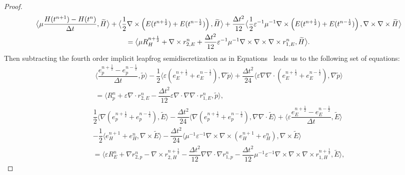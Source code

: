 \documentclass{amsart}
\theoremstyle{thmstyleone}%
\theoremstyle{thmstyletwo}%
\theoremstyle{thmstylethree}%
\newcommand{\aInnerproduct}[2]{\bigl\langle #1, #2 \bigr\rangle}
\begin{document}
\begin{proof}
\begin{subequations}
\begin{multline}
     \end{multline} \\
      \begin{multline}
  \aInnerproduct{\mu \dfrac{H(t^{n + 1}) - H(t^n)}{\Delta t}}{\widetilde{H}} +  \aInnerproduct{\dfrac{1}{2} \nabla \times \left( E(t^{n + \frac{1}{2}}) + E(t^{n - \frac{1}{2}}) \right)}{\widetilde{H}} +  \dfrac{\Delta t^2}{12} \aInnerproduct{\dfrac{1}{2} \varepsilon^{-1}\mu^{-1} \nabla \times \left( E(t^{n + \frac{1}{2}}) + E(t^{n - \frac{1}{2}}) \right)}{\nabla \times  \nabla \times \widetilde{H}} \\ =  \aInnerproduct{\mu R_H^{n + \frac{1}{2}} + \nabla \times r_{2,E}^n + \dfrac{\Delta t^2}{12} \varepsilon^{-1}\mu^{-1} \nabla \times \nabla \times \nabla \times r_{1,E}^n}{\widetilde{H}}. \label{eqn:remainder_H_lf4}
  \end{multline}
\end{subequations}
Then subtracting the fourth order implicit leapfrog semidiscretization as in Equations~ leads us to the following set of equations:
\begin{multline*}
\aInnerproduct{\dfrac{e_p^{n + \frac{1}{2}} - e_p^{n - \frac{1}{2}}}{\Delta t}}{\widetilde{p}} - \dfrac{1}{2} \aInnerproduct{ \varepsilon \left(e_E^{n + \frac{1}{2}} + e_E^{n - \frac{1}{2}} \right)}{\nabla \widetilde{p}} + \dfrac{\Delta t^2}{24} \aInnerproduct{\varepsilon \nabla \nabla \cdot \left( e_E^{n + \frac{1}{2}} + e_E^{n - \frac{1}{2}} \right)}{\nabla \widetilde{p}} \\ = \aInnerproduct{R_p^{n} + \varepsilon \nabla \cdot r_{2,E}^n - \dfrac{\Delta t^2}{12} \varepsilon \nabla \cdot \nabla \nabla \cdot r_{1,E}^n }{\widetilde{p}}, 
 \end{multline*} 
\begin{multline*}
 \dfrac{1}{2} \aInnerproduct{\nabla \left(e_p^{n + \frac{1}{2}} + e_p^{n - \frac{1}{2}}\right)}{\widetilde{E}}  - \dfrac{\Delta t^2}{24} \aInnerproduct{\nabla \left(e_p^{n + \frac{1}{2}} + e_p^{n - \frac{1}{2}} \right)}{\nabla \nabla \cdot \widetilde{E}} + \aInnerproduct{\varepsilon \dfrac{e_E^{n + \frac{1}{2}} - e_E^{n - \frac{1}{2}}}{\Delta t}}{\widetilde{E}} \\ - \dfrac{1}{2} \aInnerproduct{e_H^{n + 1} + e_H^n}{\nabla \times \widetilde{E}}  - \dfrac{\Delta t^2}{24} \aInnerproduct{ \mu^{-1}\varepsilon^{-1} \nabla \times \nabla \times \left( e_H^{n + 1} + e_H^n \right)}{\nabla \times \widetilde{E}} \\ = \aInnerproduct{\varepsilon R_E^n + \nabla r_{2,p}^n - \nabla \times r_{2,H}^{n+\frac{1}{2}} - \dfrac{\Delta t^2}{12} \nabla \nabla \cdot \nabla r_{1,p}^n - \dfrac{\Delta t^2}{12}  \mu^{-1}\varepsilon^{-1} \nabla \times \nabla \times \nabla \times r_{1,H}^{n+\frac{1}{2}}}{\widetilde{E}},

\end{multline*}
\end{proof}
\end{document}
